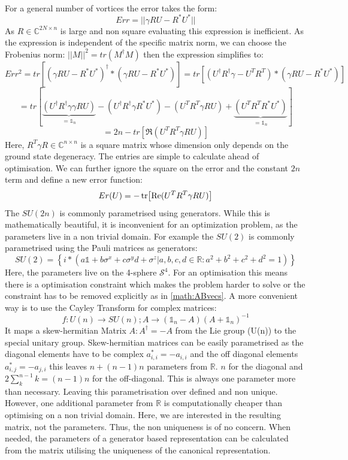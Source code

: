 \documentclass[Master]{subfiles}
\begin{document}
\hspace{1cm}\\
For a general number of vortices the error takes the form:
$$
Err = ||\gamma R U  - R^* U^*||
$$
As $R \in \mathbb{C}^{2N\times n}$ is large and non square evaluating this expression is inefficient. As the expression is independent of the specific matrix norm, we can choose the Frobenius norm:
$||M||^2 = tr(M^{\dag}M)$
then the expression simplifies to:
$$
Err^2 = tr[(\gamma R U  - R^* U^*)^{\dag}*(\gamma R U  - R^* U^*)] = 
tr[(U^{\dag} R^{\dag} \gamma - U^T R^T)*(\gamma R U  - R^* U^*)]
$$
$$
= tr \left[
\underbrace{(U^{\dag} R^{\dag} \gamma \gamma R U)}_{= \mathbb{1}_n}
-(U^{\dag} R^{\dag} \gamma R^* U^*)
-(U^T R^T \gamma R U)
+\underbrace{( U^T R^T R^* U^*)}_{= \mathbb{1}_n}\right]
$$
\begin{dmath}\label{num:GenericErrorExpr}
= 2n - tr[\Re (U^T R^T \gamma R U )]
\end{dmath}
Here, $R^T \gamma R \in \mathbb{C}^{n \times n}$  is a square matrix whose dimension only depends on the ground state degeneracy. The entries are simple to calculate ahead of optimisation. We can further ignore the square on the error and the constant $2n$ term and define a new error function:
\begin{dmath}
Er(U) = - \tr[\Re (U^T R^T \gamma R U )]
\end{dmath}
The $SU(2n)$ is commonly parametrised using generators.
While this is mathematically beautiful, it is inconvenient for an optimization problem, as the parameters live in a non trivial domain. For example the $SU(2)$ is commonly parametrised using the Pauli matrices as generators:
$$ SU(2) = \left\{ i* (a \mathbb{1} + b \sigma^x + c \sigma^y d + \sigma^z | a,b,c,d \in \mathbb{R} : a^2+b^2+c^2+d^2 = 1) \right\}$$
Here, the parameters live on the 4-sphere $\mathcal{S}^4$. For an optimisation this means there is a optimisation constraint which makes the problem harder to solve or the constraint has to be removed explicitly as in \eqref{math:ABvecs}. A more convenient way is to use the Cayley Transform for complex matrices: 
$$
f: U(n) \rightarrow SU(n); A\rightarrow(\mathbb{1}_n - A)(A + \mathbb{1}_n)^{-1}
$$
It maps a skew-hermitian Matrix $A : A^{\dag} = -A$ from the Lie group (U(n)) to the special unitary group.  Skew-hermitian matrices can be easily parametrised as the diagonal elements have to be complex $a_{i,i}^* = - a_{i,i}$ and the off diagonal elements $a_{i,j}^* = - a_{j,i}$ this leaves 
$n + (n - 1) n$ parameters from $\mathbb{R}$. $n$ for the diagonal and $2 \sum_k^{n-1} k =  (n - 1) n$ for the off-diagonal. This is always one parameter more than necessary. Leaving this parametrisation over defined and non unique. However, one additional parameter from $\mathbb{R}$ is computationally cheaper than optimising on a non trivial domain. Here, we are interested in the resulting matrix, not the parameters. Thus, the non uniqueness is of no concern. When needed, the parameters of a generator based representation can be calculated from the matrix utilising the uniqueness of the canonical representation.\\
\end{document}
